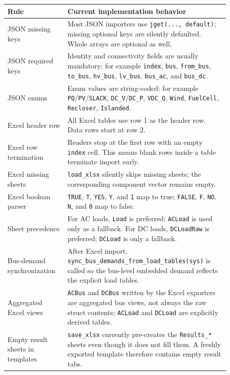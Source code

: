 \begin{longtable}{L{0.22\linewidth}L{0.66\linewidth}}
\toprule
Rule & Current implementation behavior \\
\midrule
\endhead
JSON missing keys & Most JSON importers use \texttt{jget(..., default)}; missing optional keys are silently defaulted.  Whole arrays are optional as well. \\
JSON required keys & Identity and connectivity fields are usually mandatory: for example \texttt{index}, \texttt{bus}, \texttt{from\_bus}, \texttt{to\_bus}, \texttt{hv\_bus}, \texttt{lv\_bus}, \texttt{bus\_ac}, and \texttt{bus\_dc}. \\
JSON enums & Enum values are string-coded: for example \texttt{PQ}/\texttt{PV}/\texttt{SLACK}, \texttt{DC\_V}/\texttt{DC\_P}, \texttt{VDC\_Q}, \texttt{Wind}, \texttt{FuelCell}, \texttt{Recloser}, \texttt{Islanded}. \\
Excel header row & All Excel tables use row 1 as the header row.  Data rows start at row 2. \\
Excel row termination & Readers stop at the first row with an empty \texttt{index} cell.  This means blank rows inside a table terminate import early. \\
Excel missing sheets & \texttt{load\_xlsx} silently skips missing sheets; the corresponding component vector remains empty. \\
Excel boolean parser & \texttt{TRUE}, \texttt{T}, \texttt{YES}, \texttt{Y}, and \texttt{1} map to true; \texttt{FALSE}, \texttt{F}, \texttt{NO}, \texttt{N}, and \texttt{0} map to false. \\
Sheet precedence & For AC loads, \texttt{Load} is preferred; \texttt{ACLoad} is used only as a fallback.  For DC loads, \texttt{DCLoadRaw} is preferred; \texttt{DCLoad} is only a fallback. \\
Bus-demand synchronization & After Excel import, \texttt{sync\_bus\_demands\_from\_load\_tables(sys)} is called so the bus-level embedded demand reflects the explicit load tables. \\
Aggregated Excel views & \texttt{ACBus} and \texttt{DCBus} written by the Excel exporters are aggregated bus views, not always the raw struct contents; \texttt{ACLoad} and \texttt{DCLoad} are explicitly derived tables. \\
Empty result sheets in templates & \texttt{save\_xlsx} currently pre-creates the \texttt{Results\_*} sheets even though it does not fill them.  A freshly exported template therefore contains empty result tabs. \\
\bottomrule
\end{longtable}

